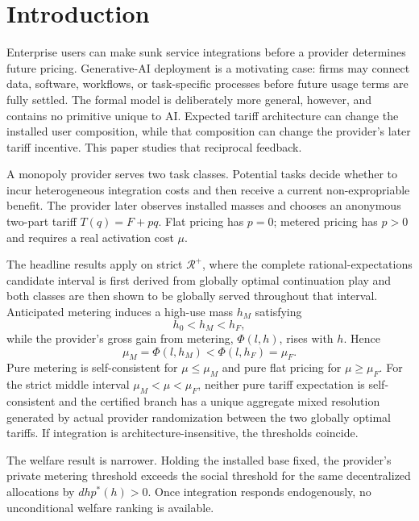 \section{Introduction}\label{sec:introduction}

Enterprise users can make sunk service integrations before a provider determines future pricing. Generative-AI deployment is a motivating case: firms may connect data, software, workflows, or task-specific processes before future usage terms are fully settled. The formal model is deliberately more general, however, and contains no primitive unique to AI. Expected tariff architecture can change the installed user composition, while that composition can change the provider's later tariff incentive. This paper studies that reciprocal feedback.

A monopoly provider serves two task classes. Potential tasks decide whether to incur heterogeneous integration costs and then receive a current non-expropriable benefit. The provider later observes installed masses and chooses an anonymous two-part tariff $T(q)=F+pq$. Flat pricing has $p=0$; metered pricing has $p>0$ and requires a real activation cost $\mu$.

The headline results apply on strict $\mathcal R^+$, where the complete rational-expectations candidate interval is first derived from globally optimal continuation play and both classes are then shown to be globally served throughout that interval. Anticipated metering induces a high-use mass $h_M$ satisfying
\[
 h_0<h_M<h_F,
\]
while the provider's gross gain from metering, $\Phi(l,h)$, rises with $h$. Hence
\[
 \mu_M=\Phi(l,h_M)<\Phi(l,h_F)=\mu_F.
\]
Pure metering is self-consistent for $\mu\leq\mu_M$ and pure flat pricing for $\mu\geq\mu_F$. For the strict middle interval $\mu_M<\mu<\mu_F$, neither pure tariff expectation is self-consistent and the certified branch has a unique aggregate mixed resolution generated by actual provider randomization between the two globally optimal tariffs. If integration is architecture-insensitive, the thresholds coincide.

The welfare result is narrower. Holding the installed base fixed, the provider's private metering threshold exceeds the social threshold for the same decentralized allocations by $d h p^*(h)>0$. Once integration responds endogenously, no unconditional welfare ranking is available.

